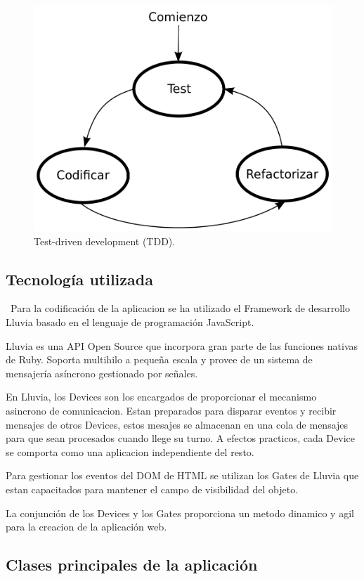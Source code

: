  \begin{figure}[h]
 \centering
 \includegraphics[scale=0.3]{../images/tdd.png}
 \caption{Test-driven development (TDD).}
 \label{fig:../images/tdd.png}
 \end{figure}

\subsection{Tecnología utilizada}
\label{sec:tecnologia_utilizada}
\
Para la codificación de la aplicacion se ha utilizado el Framework de desarrollo Lluvia basado en el lenguaje de programación JavaScript. 

Lluvia es una API Open Source que incorpora gran parte de las funciones nativas de Ruby. Soporta multihilo a pequeña escala y provee de un sistema de mensajería asíncrono gestionado por señales. 

En Lluvia, los Devices son los encargados de proporcionar el mecanismo asincrono de comunicacion. Estan preparados para disparar eventos y recibir mensajes de otros Devices, estos mesajes se almacenan en una cola de mensajes para que sean procesados cuando llege su turno. A efectos practicos, cada Device se comporta como una aplicacion independiente del resto.

Para gestionar los eventos del DOM de HTML se utilizan los Gates de Lluvia que estan capacitados para mantener el campo de visibilidad del objeto. 

La conjunción de los Devices y los Gates proporciona un metodo dinamico y agil para la creacion de la aplicación web. 
\subsection{Clases principales de la aplicación}
\label{sec:clases_principlaes}

